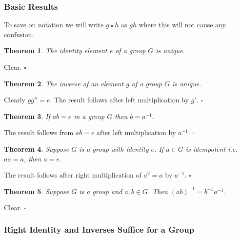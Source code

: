 \documentclass[10pt]{article}
\newtheorem{theorem}{Theorem}[section]
\newenvironment{proof}[1][Proof]{\begin{trivlist}
\item[\hskip \labelsep {\itshape #1}]}{\end{trivlist}}
\begin{document}
\subsubsection{Basic Results}

To save on notation we will write $g\star h$ as $gh$ where this will not cause any confusion.
\begin{theorem}
The identity element $e$ of a group $G$ is unique.
\end{theorem}

\begin{proof}
Clear. $\square$
\end{proof}

\begin{theorem}
The inverse of an element $g$ of a group $G$ is unique.
\end{theorem}

\begin{proof}
Clearly $gg'' = e$. The result follows after left multiplication by $g'$. $\square$
\end{proof}

\begin{theorem}
If $ab = e$ in a group $G$ then $b = a^{-1}$.
\end{theorem}

\begin{proof}
The result follows from $ab = e$ after left multiplication by $a^{-1}$. $\square$
\end{proof}

\begin{theorem}\label{idempotent_is_identity}
Suppose $G$ is a group with identity $e$. If $a \in G$ is idempotent i.e. $aa = a$, then $a = e$.
\end{theorem}

\begin{proof}
The result follows after right multiplication of $a^2 = a$ by $a^{-1}$. $\square$
\end{proof}

\begin{theorem} \label{product_inverse}
Suppose $G$ is a group and $a, b \in G$. Then $(ab)^{-1} = b^{-1}a^{-1}$.
\end{theorem}

\begin{proof}
Clear. $\square$
\end{proof}

\subsubsection{Right Identity and Inverses Suffice for a Group}
\end{document}
